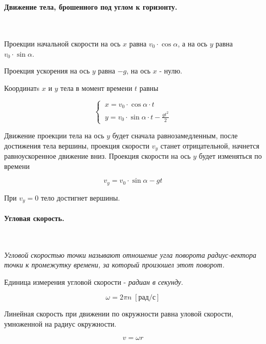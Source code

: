 \documentclass[a4paper,12pt]{article}
\begin{document}
		\

		\paragraph*{Движение тела, брошенного под углом к горизонту.} \

		Проекции начальной скорости на ось $x$ равна $v_0 \cdot \cos \alpha$, а на ось $y$ равна
		$v_0 \cdot \sin \alpha$. 
		
		Проекция ускорения на ось $y$ равна $-g$, на ось $x$ - нулю.

		Координатs $x$ и $y$ тела в момент времени $t$ равны

		\begin{equation*}
			\begin{cases}
				\ x = v_0 \cdot \cos \alpha \cdot t \\
				\ y = v_0 \cdot \sin \alpha \cdot t - \frac{gt^2}{2}
			\end{cases}
		\end{equation*}
		
		Движение проекции тела на ось $y$ будет сначала равнозамедленным, после достижения тела
		вершины, проекция скорости $v_y$ станет отрицательной, начнется равноускоренное движение 
		вниз. Проекция скорости на ось $y$ будет изменяться по времени
		
		\begin{equation*}
			v_y = v_0 \cdot \sin \alpha - gt
		\end{equation*}

		При $v_y = 0$ тело достигнет вершины.

		\paragraph{Угловая скорость.} \

		\textit{Угловой скоростью точки называют отношение угла поворота радиус-вектора точки к
		промежутку времени, за который произошел этот поворот.}

		Единица измерения угловой скорости - \textit{радиан в секунду}.

		\begin{equation}
			\omega = 2 \pi n \; [\text{рад/с}]
		\end{equation}

		Линейная скорость при движении по окружности равна уловой скорости, умноженной
		на радиус окружности.
		
		\begin{equation}
			v = \omega r
		\end{equation}
\end{document}
